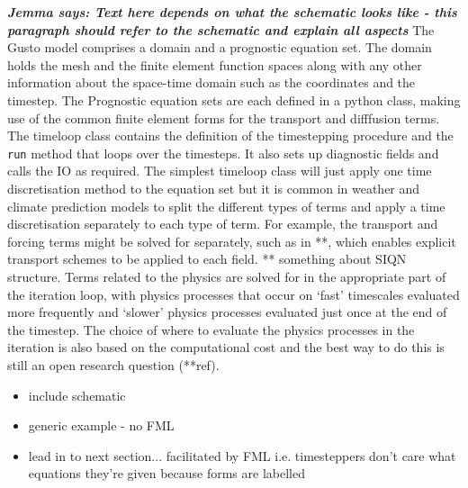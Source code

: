 \documentclass[journal abbreviation, manuscript]{copernicus}
\newcommand{\JScomment}[1]{\textit{\textbf{Jemma says: #1}}}
\begin{document}
\begin{figure}
\end{figure}

\JScomment{Text here depends on what the schematic looks like - this
  paragraph should refer to the schematic and explain all aspects} The
Gusto model comprises a domain and a prognostic equation set. The
domain holds the mesh and the finite element function spaces along
with any other information about the space-time domain such as the
coordinates and the timestep. The Prognostic equation sets are each
defined in a python class, making use of the common finite element
forms for the transport and difffusion terms. The timeloop class
contains the definition of the timestepping procedure and the
\texttt{run} method that loops over the timesteps. It also sets up
diagnostic fields and calls the IO as required. The simplest timeloop
class will just apply one time discretisation method to the equation
set but it is common in weather and climate prediction models to split
the different types of terms and apply a time discretisation
separately to each type of term. For example, the transport and
forcing terms might be solved for separately, such as in **, which
enables explicit transport schemes to be applied to each field. **
something about SIQN structure. Terms related to the physics are
solved for in the appropriate part of the iteration loop, with physics
processes that occur on `fast' timescales evaluated more frequently
and `slower' physics processes evaluated just once at the end of the
timestep. The choice of where to evaluate the physics processes in the
iteration is also based on the computational cost and the best way to
do this is still an open research question (**ref).

\begin{itemize}
\item include schematic
\item generic example - no FML
\item lead in to next section... facilitated by FML i.e. timesteppers don't care what equations they're given because forms are labelled
\end{itemize}
\end{document}

